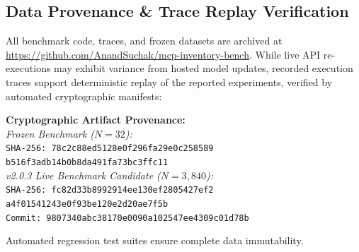 \subsection{Data Provenance \texorpdfstring{\&}{and} Trace Replay Verification}
All benchmark code, traces, and frozen datasets are archived at \url{https://github.com/AnandSuchak/mcp-inventory-bench}. While live API re-executions may exhibit variance from hosted model updates, recorded execution traces support deterministic replay of the reported experiments, verified by automated cryptographic manifests:
\begin{center}
\footnotesize
\textbf{Cryptographic Artifact Provenance:}\\
\textit{Frozen Benchmark ($N=32$):}\\
\texttt{\scriptsize SHA-256: 78c2c88ed5128e0f296fa29e0c258589}\\
\texttt{\scriptsize \phantom{SHA-256: }b516f3adb14b0b8da491fa73bc3ffc11}\\
\textit{v2.0.3 Live Benchmark Candidate ($N=3,840$):}\\
\texttt{\scriptsize SHA-256: fc82d33b8992914ee130ef2805427ef2}\\
\texttt{\scriptsize \phantom{SHA-256: }a4f01541243e0f93be120e2d20ae7f5b}\\
\texttt{\scriptsize Commit: 9807340abc38170e0090a102547ee4309c01d78b}
\end{center}
Automated regression test suites ensure complete data immutability.

